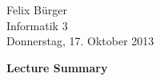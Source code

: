 \documentclass[parskip=full]{scrartcl}
\begin{document}
Felix Bürger\\
Informatik 3\\
Donnerstag, 17. Oktober 2013

\Huge\textbf{Lecture Summary}

\doublespacing
\normalsize

\lipsum[1]

\lipsum[2]
\end{document}
